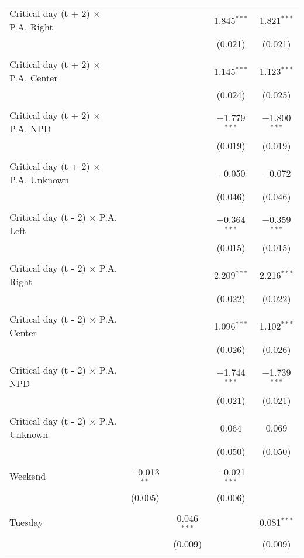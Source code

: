 \documentclass[
]{article}
\begin{document}
\begin{table}[!htbp]
{\begin{tabular}{@{\extracolsep{5pt}}lcccc}
 Critical day (t + 2) $\times$ P.A. Right &  &  & 1.845$^{***}$ & 1.821$^{***}$ \\ 
  &  &  & (0.021) & (0.021) \\ 
  & & & & \\ 
 Critical day (t + 2) $\times$ P.A. Center &  &  & 1.145$^{***}$ & 1.123$^{***}$ \\ 
  &  &  & (0.024) & (0.025) \\ 
  & & & & \\ 
 Critical day (t + 2) $\times$ P.A. NPD &  &  & $-$1.779$^{***}$ & $-$1.800$^{***}$ \\ 
  &  &  & (0.019) & (0.019) \\ 
  & & & & \\ 
 Critical day (t + 2) $\times$ P.A. Unknown &  &  & $-$0.050 & $-$0.072 \\ 
  &  &  & (0.046) & (0.046) \\ 
  & & & & \\ 
 Critical day (t - 2) $\times$ P.A. Left &  &  & $-$0.364$^{***}$ & $-$0.359$^{***}$ \\ 
  &  &  & (0.015) & (0.015) \\ 
  & & & & \\ 
 Critical day (t - 2) $\times$ P.A. Right &  &  & 2.209$^{***}$ & 2.216$^{***}$ \\ 
  &  &  & (0.022) & (0.022) \\ 
  & & & & \\ 
 Critical day (t - 2) $\times$ P.A. Center &  &  & 1.096$^{***}$ & 1.102$^{***}$ \\ 
  &  &  & (0.026) & (0.026) \\ 
  & & & & \\ 
 Critical day (t - 2) $\times$ P.A. NPD &  &  & $-$1.744$^{***}$ & $-$1.739$^{***}$ \\ 
  &  &  & (0.021) & (0.021) \\ 
  & & & & \\ 
 Critical day (t - 2) $\times$ P.A. Unknown &  &  & 0.064 & 0.069 \\ 
  &  &  & (0.050) & (0.050) \\ 
  & & & & \\ 
 Weekend & $-$0.013$^{**}$ &  & $-$0.021$^{***}$ &  \\ 
  & (0.005) &  & (0.006) &  \\ 
  & & & & \\ 
 Tuesday &  & 0.046$^{***}$ &  & 0.081$^{***}$ \\ 
  &  & (0.009) &  & (0.009) \\ 

\end{tabular}}
\end{table}
\end{document}
